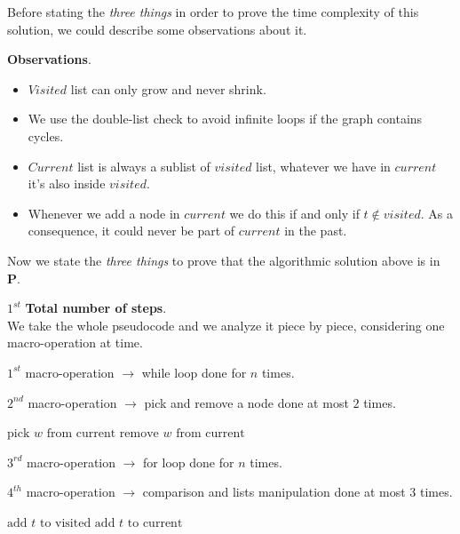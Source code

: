 \begin{example}[title = Decision problem about graphs]
    Before stating the \textit{three things} in order to prove the time complexity of this solution, we could describe some observations about it. \vspace{7pt}

    \textbf{Observations}.
    \begin{itemize}
        \renewcommand{\labelitemi}{-}
        \item $Visited$ list can only grow and never shrink.
        \item We use the double-list check to avoid infinite loops if the graph contains cycles.
        \item $Current$ list is always a sublist of $visited$ list, whatever we have in $current$ it's also inside $visited$.
        \item Whenever we add a node in $current$ we do this if and only if $t \notin visited$. As a consequence, it could never be part of $current$ in the past.
    \end{itemize} \vspace{7pt}

    Now we state the \textit{three things} to prove that the algorithmic solution above is in \textbf{P}. \vspace{14pt}

    $1^{st}$ \textbf{Total number of steps}. \\
    We take the whole pseudocode and we analyze it piece by piece, considering one macro-operation at time. \vspace{7pt}
    
    $1^{st}$ macro-operation $\rightarrow$ while loop done for $n$ times.
    \begin{algorithmic}
        \EndWhile
    \end{algorithmic}

    $2^{nd}$ macro-operation $\rightarrow$ pick and remove a node done at most $2$ times.
    \begin{algorithmic}
        \State $\text{pick } w \text{ from current}$
        \State $\text{remove } w \text{ from current}$
    \end{algorithmic}

    $3^{rd}$ macro-operation $\rightarrow$ for loop done for $n$ times.
    \begin{algorithmic}
        \EndFor
    \end{algorithmic}

    $4^{th}$ macro-operation $\rightarrow$ comparison and lists manipulation done at most $3$ times.
    \begin{algorithmic}
            \State $\text{add } t \text{ to visited}$
            \State $\text{add } t \text{ to current}$
        \EndIf
    \end{algorithmic}


\end{example}
